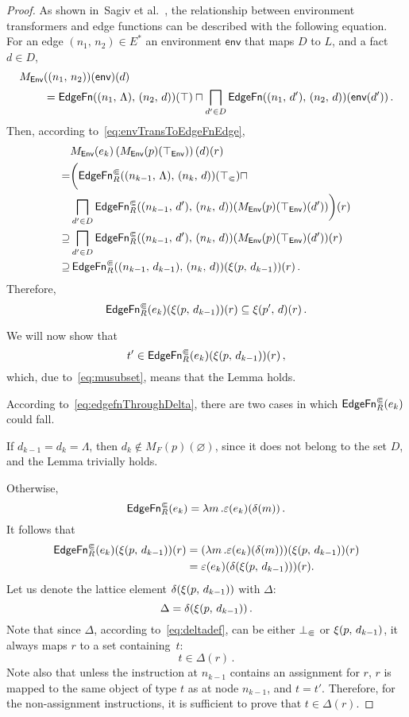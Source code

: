 \begin{proof}
As shown in~Sagiv et al.~\cite{sagiv1996precise}, the relationship between environment transformers and edge functions can be described with the following equation. For an edge $(n_1,\,n_2)\in E^*$ an environment $\textsf{env}$ that maps $D$ to $L$, and a fact $d\in D$,
\begin{align}\label{eq:envTransToEdgeFnEdge}
  M_\textsf{Env}&((n_1,\,n_2))(\textsf{env})(d)\notag\\
  &=\textsf{EdgeFn}((n_1,\,\Lambda),\,(n_2,\,d))(\top)\sqcap\bigsqcap_{d'\in D}\textsf{EdgeFn}((n_1,\,d'),\,(n_2,\,d))(\textsf{env}(d'))\,.
\end{align}  
Then, according to~\eqref{eq:envTransToEdgeFnEdge},
  \begin{align*}
    &M_\textsf{Env}(e_k)\left(M_\textsf{Env}(p)(\top_\textsf{Env})\right)(d)(r)\\
      =&\bigg(\textsf{EdgeFn}^\Subset_{R}((n_{k-1},\,\Lambda),\,(n_k,\,d))(\top_\Subset)\sqcap\\
       &\bigsqcap_{d'\in D}\textsf{EdgeFn}^\Subset_{R}((n_{k-1},\,d'),\,(n_k,\,d))(M_\textsf{Env}(p)(\top_\textsf{Env})(d'))\bigg)(r)\\
      \supseteq&
        \bigsqcap_{d'\in D}\textsf{EdgeFn}^\Subset_{R}((n_{k-1},\,d'),\,(n_k,\,d))(M_\textsf{Env}(p)(\top_\textsf{Env})(d'))(r)\\
      \supseteq&\,\textsf{EdgeFn}^\Subset_{R}((n_{k-1},\,d_{k-1}),\,(n_k,\,d))(\xi(p,\,d_{k-1}))(r)\,.
  \end{align*}
  Therefore, 
  \begin{equation}\label{eq:musubset}
    \textsf{EdgeFn}^\Subset_{R}(e_k)(\xi(p,\,d_{k-1}))(r)\subseteq\xi(p',\,d)(r)\,.
  \end{equation}
  
  We will now show that
  \[
    t'\in\textsf{EdgeFn}^\Subset_{R}(e_k)(\xi(p,\,d_{k-1}))(r)\,,
  \]
  which, due to~\eqref{eq:musubset}, means that the Lemma holds.
  
  According to~\eqref{eq:edgefnThroughDelta}, there are two cases in which $\textsf{EdgeFn}^\Subset_{R}(e_k)$ could fall.

  If $d_{k-1}=d_k=\Lambda$, then $d_k\notin M_F(p)(\varnothing)$, since it does not belong to the set $D$, and the Lemma trivially holds.
  
  Otherwise, 
  \[
    \textsf{EdgeFn}^\Subset_{R}(e_k)=\lambda m\,.\varepsilon(e_k)(\delta(m))\,.
  \]
  It follows that
  \begin{align}\label{eq:efek}
    \textsf{EdgeFn}^\Subset_{R}(e_k)(\xi(p,\,d_{k-1}))(r)
    &=(\lambda m\,.\varepsilon(e_k)(\delta(m)))(\xi(p,\,d_{k-1}))(r)\notag\\
    &=\varepsilon(e_k)(\delta(\xi(p,\,d_{k-1})))(r).
  \end{align}
  Let us denote the lattice element $\delta(\xi(p,\,d_{k-1}))$ with $\Delta$:
  \[
    \Delta=\delta(\xi(p,\,d_{k-1}))\,.
  \]
  Note that since $\Delta$, according to~\eqref{eq:deltadef}, can be either $\bot_\Subset$ or $\xi(p,\,d_{k-1})$, it always maps $r$ to a set containing~$t$:
  \begin{equation}\label{eq:deltaContainsT}
    t\in\Delta(r)\,.
  \end{equation}
  Note also that unless the instruction at $n_{k-1}$ contains an assignment for $r$, $r$ is mapped to the same object of type $t$ as at node $n_{k-1}$, and $t=t'$. Therefore, for the non-assignment instructions, it is sufficient to prove that $t\in\Delta(r)$.
 

\end{proof}
